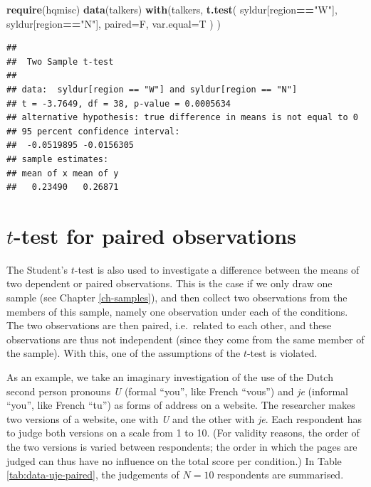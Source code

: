 \documentclass[
]{book}
\newenvironment{Shaded}{\begin{snugshade}}{\end{snugshade}}
\newcommand{\AttributeTok}[1]{\textcolor[rgb]{0.13,0.29,0.53}{#1}}
\newcommand{\FunctionTok}[1]{\textcolor[rgb]{0.13,0.29,0.53}{\textbf{#1}}}
\newcommand{\NormalTok}[1]{#1}
\newcommand{\SpecialCharTok}[1]{\textcolor[rgb]{0.81,0.36,0.00}{\textbf{#1}}}
\newcommand{\StringTok}[1]{\textcolor[rgb]{0.31,0.60,0.02}{#1}}
\begin{document}
\begin{Shaded}
\begin{Highlighting}[]
\FunctionTok{require}\NormalTok{(hqmisc)}
\FunctionTok{data}\NormalTok{(talkers)}
\FunctionTok{with}\NormalTok{(talkers, }\FunctionTok{t.test}\NormalTok{( syldur[region}\SpecialCharTok{==}\StringTok{"W"}\NormalTok{], syldur[region}\SpecialCharTok{==}\StringTok{"N"}\NormalTok{], }
            \AttributeTok{paired=}\NormalTok{F, }\AttributeTok{var.equal=}\NormalTok{T ) )}
\end{Highlighting}
\end{Shaded}

\begin{verbatim}
## 
##  Two Sample t-test
## 
## data:  syldur[region == "W"] and syldur[region == "N"]
## t = -3.7649, df = 38, p-value = 0.0005634
## alternative hypothesis: true difference in means is not equal to 0
## 95 percent confidence interval:
##  -0.0519895 -0.0156305
## sample estimates:
## mean of x mean of y 
##   0.23490   0.26871
\end{verbatim}

\section{\texorpdfstring{\(t\)-test for paired observations}{t-test for paired observations}}\label{sec:ttest-paired}

The Student's \(t\)-test is also used to investigate a difference between the
means of two dependent or paired observations. This is the case if we only draw
one sample (see Chapter \ref{ch-samples}), and then collect two observations
from the members of this sample,
namely one observation under each of the conditions. The two
observations are then paired, i.e.~related to each other,
and these observations are thus not independent (since they come
from the same member of the sample). With this, one of the assumptions of
the \(t\)-test is violated.

As an example, we take an imaginary investigation of the use of the
Dutch second person pronouns \emph{U} (formal ``you'', like French ``vous'') and \emph{je} (informal ``you'', like French ``tu'') as forms of address on a website. The researcher makes two versions
of a website, one with \emph{U} and the other with \emph{je}. Each
respondent has to judge both versions on a scale from 1 to 10. (For validity
reasons, the order of the two versions is varied between respondents;
the order in which the pages are judged can thus
have no influence on the total score per condition.) In Table
\ref{tab:data-uje-paired}, the judgements of \(N=10\)
respondents are summarised.
\end{document}
